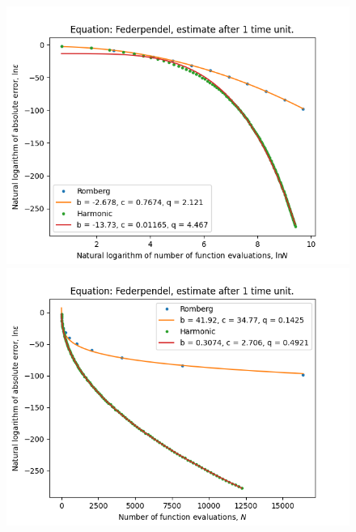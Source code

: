 \begin{figure}[H]
\centering
\begin{minipage}{0.45\textwidth}
\centering
\includegraphics[scale=0.45]{emr_plots/federpendel_1_hp_log_log_pow_fit_trend.png}
\end{minipage}
\begin{minipage}{0.45\textwidth}
\centering
\includegraphics[scale=0.45]{emr_plots/federpendel_1_hp_trend.png}
\end{minipage}
\end{figure}

